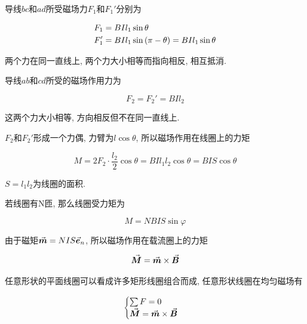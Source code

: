 导线$bc$和$ad$所受磁场力$F_1$和$F_1'$分别为

\begin{align*}	
	F_1 &= BIl_1 \sin\theta \\
	F_1' &= BIl_1 \sin\qty(\pi - \theta) = BIl_1 \sin\theta 
\end{align*}

两个力在同一直线上, 两个力大小相等而指向相反, 相互抵消. 

导线$ab$和$cd$所受的磁场作用力为

\begin{equation*}
	F_2 = F_2' = BIl_2
\end{equation*}

这两个力大小相等, 方向相反但不在同一直线上. 

$F_2$和$F_2'$形成一个力偶, 力臂为$l\cos\theta$, 所以磁场作用在线圈上的力矩

\begin{equation}
	M = 2F_2\cdot \dfrac{l_2}{2} \cos\theta = BIl_1l_2\cos\theta = BIS\cos\theta \label{C8-eq17}
\end{equation}

$S = l_1 l_2$为线圈的面积. 

若线圈有N匝, 那么线圈受力矩为

\begin{equation*}
	M = NBIS \sin\varphi
\end{equation*}

由于磁矩$\va*{m} = NIS\va*{e}_n$, 所以磁场作用在载流圈上的力矩

\begin{equation}
	\va*{M} = \va*{m} \times \va*{B} \label{C8-eq18}
\end{equation}

任意形状的平面线圈可以看成许多矩形线圈组合而成, 任意形状线圈在均匀磁场有

\begin{equation*}
	\begin{cases}
		\sum F = 0 \\
		\va*{M} = \va*{m} \times \va*{B}
	\end{cases}
\end{equation*}

